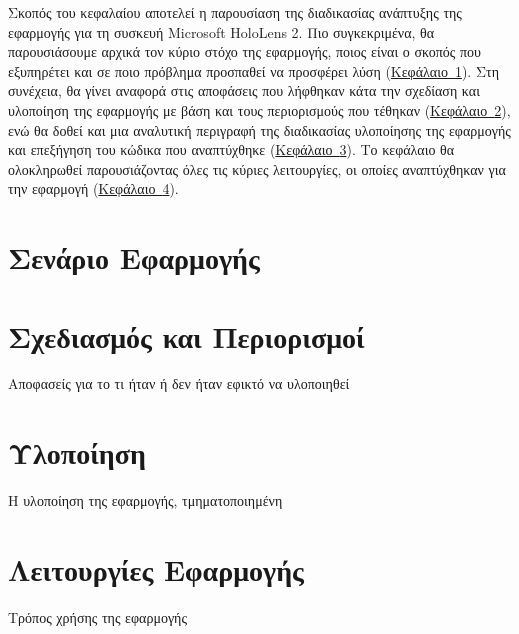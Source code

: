 
Σκοπός του κεφαλαίου αποτελεί η παρουσίαση της διαδικασίας ανάπτυξης της εφαρμογής για τη συσκευή Microsoft HoloLens 2. Πιο συγκεκριμένα, θα παρουσιάσουμε αρχικά τον κύριο στόχο της εφαρμογής, ποιος είναι ο σκοπός που εξυπηρέτει και σε ποιο πρόβλημα προσπαθεί να προσφέρει λύση (\hyperref[sec:appScenario]{Κεφάλαιο~\ref*{sec:appScenario}}). Στη συνέχεια, θα γίνει αναφορά στις αποφάσεις που λήφθηκαν κάτα την σχεδίαση και υλοποίηση της εφαρμογής με βάση και τους περιορισμούς που τέθηκαν (\hyperref[sec:appDesignAndLimitations]{Κεφάλαιο~\ref*{sec:appDesignAndLimitations}}), ενώ θα δοθεί και μια αναλυτική περιγραφή της διαδικασίας υλοποίησης της εφαρμογής και επεξήγηση του κώδικα που αναπτύχθηκε (\hyperref[sec:appImplementation]{Κεφάλαιο~\ref*{sec:appImplementation}}). Το κεφάλαιο θα ολοκληρωθεί παρουσιάζοντας όλες τις κύριες λειτουργίες, οι οποίες αναπτύχθηκαν για την εφαρμογή (\hyperref[sec:appFunctionalities]{Κεφάλαιο~\ref*{sec:appFunctionalities}}).

\section{Σενάριο Εφαρμογής}\label{sec:appScenario}


\section{Σχεδιασμός και Περιορισμοί}\label{sec:appDesignAndLimitations}
Αποφασείς για το τι ήταν ή δεν ήταν εφικτό να υλοποιηθεί

\section{Υλοποίηση}\label{sec:appImplementation}
Η υλοποίηση της εφαρμογής, τμηματοποιημένη

\section{Λειτουργίες Εφαρμογής}\label{sec:appFunctionalities}
Τρόπος χρήσης της εφαρμογής

